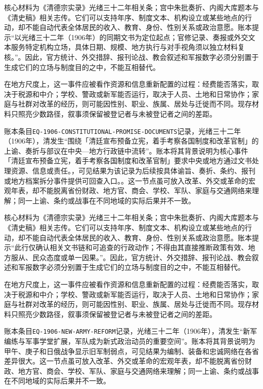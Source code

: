 核心材料为《清德宗实录》光绪三十二年相关条；宫中朱批奏折、内阁大库题本与《清史稿》相关志传。它们可以支持年序、制度文本、机构设立或某些地点的行动，却不能自动代表全体居民的收入、教育、身份、性别关系或政治意愿。账本提示“以光绪三十二年（1906年）的同期文书为定位起点；官修记录、奏报或外交文本服务特定机构立场，具体日期、规模、地方执行与对手视角须以独立材料复核。”。因此，官方统计、外交措辞、报刊论战、教会叙述和军报数字必须分别置于生成它们的立场与制度目的之中，不能互相替代。

在地方尺度上，这一事件应被看作资源和信息重新配置的过程：经费能否落实，取决于税源和中介；学校、警政或新军能否运行，取决于人员、土地和日常协作；家庭与社群对改革的经历，则可能因性别、职业、族属、居处与迁徙而不同。现存材料只照亮少数路径，叙事须保留被登记者与未被登记者之间的差距。

账本条目\texttt{EQ-1906-CONSTITUTIONAL-PROMISE-DOCUMENTS}记录，光绪三十二年（1906年），清发生“围绕「清廷宣布预备立宪，着手考察各国制度和改革官制」的上谕、奏折与部议在中央—地方行政链中流转”。账本将其背景说明为核心事件「清廷宣布预备立宪，着手考察各国制度和改革官制」要求中央或地方通过文书处理资源、信息或责任。，可见结果为该记录为后续按具体谕旨、奏折、条约、报刊或地方档案拆分事件提供可回查入口。。这一节点虽可放入改革、外交或革命的宏观年表，却不能脱离省份财政、地方官、商会、学校、军队、家庭与交通网络来理解；同一上谕、条约或战事在不同地域的实际后果并不一致。

核心材料为《清德宗实录》光绪三十二年相关条；宫中朱批奏折、内阁大库题本与《清史稿》相关志传。它们可以支持年序、制度文本、机构设立或某些地点的行动，却不能自动代表全体居民的收入、教育、身份、性别关系或政治意愿。账本提示“此行仅确认相关文书链和可追查的行政动作；不得由其直接推断政策有效、地方服从、民众态度或单一因果。”。因此，官方统计、外交措辞、报刊论战、教会叙述和军报数字必须分别置于生成它们的立场与制度目的之中，不能互相替代。

在地方尺度上，这一事件应被看作资源和信息重新配置的过程：经费能否落实，取决于税源和中介；学校、警政或新军能否运行，取决于人员、土地和日常协作；家庭与社群对改革的经历，则可能因性别、职业、族属、居处与迁徙而不同。现存材料只照亮少数路径，叙事须保留被登记者与未被登记者之间的差距。

账本条目\texttt{EQ-1906-NEW-ARMY-REFORM}记录，光绪三十二年（1906年），清发生“新军编练与军事学堂扩展，军队成为新式政治动员的重要空间”。账本将其背景说明为甲午、庚子和日俄战争显示旧军制弱点，可见结果为编制、装备和忠诚网络在各省差异很大。这一节点虽可放入改革、外交或革命的宏观年表，却不能脱离省份财政、地方官、商会、学校、军队、家庭与交通网络来理解；同一上谕、条约或战事在不同地域的实际后果并不一致。

